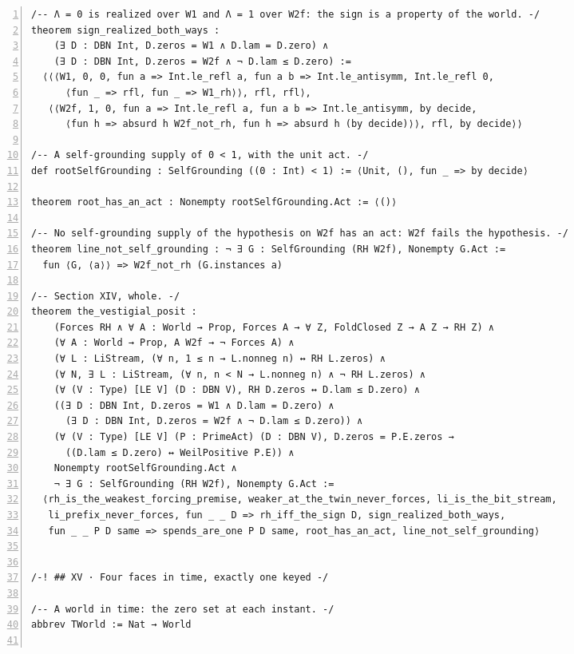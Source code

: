 \documentclass[10pt]{article}
\newcommand{\leansize}{\fontsize{5.5pt}{6.75pt}\selectfont}
\begin{document}
\begin{multicols}{2}
\begin{Verbatim}[numbers=left,firstnumber=1,numbersep=3pt,xleftmargin=2.6em,breaklines=true,breakanywhere=true,breakautoindent=false,breakindent=1.4em,breaksymbolleft={},breakanywheresymbolpre={},fontsize=\leansize]
/-- Λ = 0 is realized over W1 and Λ = 1 over W2f: the sign is a property of the world. -/
theorem sign_realized_both_ways :
    (∃ D : DBN Int, D.zeros = W1 ∧ D.lam = D.zero) ∧
    (∃ D : DBN Int, D.zeros = W2f ∧ ¬ D.lam ≤ D.zero) :=
  ⟨⟨⟨W1, 0, 0, fun a => Int.le_refl a, fun a b => Int.le_antisymm, Int.le_refl 0,
      ⟨fun _ => rfl, fun _ => W1_rh⟩⟩, rfl, rfl⟩,
   ⟨⟨W2f, 1, 0, fun a => Int.le_refl a, fun a b => Int.le_antisymm, by decide,
      ⟨fun h => absurd h W2f_not_rh, fun h => absurd h (by decide)⟩⟩, rfl, by decide⟩⟩

/-- A self-grounding supply of 0 < 1, with the unit act. -/
def rootSelfGrounding : SelfGrounding ((0 : Int) < 1) := ⟨Unit, (), fun _ => by decide⟩

theorem root_has_an_act : Nonempty rootSelfGrounding.Act := ⟨()⟩

/-- No self-grounding supply of the hypothesis on W2f has an act: W2f fails the hypothesis. -/
theorem line_not_self_grounding : ¬ ∃ G : SelfGrounding (RH W2f), Nonempty G.Act :=
  fun ⟨G, ⟨a⟩⟩ => W2f_not_rh (G.instances a)

/-- Section XIV, whole. -/
theorem the_vestigial_posit :
    (Forces RH ∧ ∀ A : World → Prop, Forces A → ∀ Z, FoldClosed Z → A Z → RH Z) ∧
    (∀ A : World → Prop, A W2f → ¬ Forces A) ∧
    (∀ L : LiStream, (∀ n, 1 ≤ n → L.nonneg n) ↔ RH L.zeros) ∧
    (∀ N, ∃ L : LiStream, (∀ n, n < N → L.nonneg n) ∧ ¬ RH L.zeros) ∧
    (∀ (V : Type) [LE V] (D : DBN V), RH D.zeros ↔ D.lam ≤ D.zero) ∧
    ((∃ D : DBN Int, D.zeros = W1 ∧ D.lam = D.zero) ∧
      (∃ D : DBN Int, D.zeros = W2f ∧ ¬ D.lam ≤ D.zero)) ∧
    (∀ (V : Type) [LE V] (P : PrimeAct) (D : DBN V), D.zeros = P.E.zeros →
      ((D.lam ≤ D.zero) ↔ WeilPositive P.E)) ∧
    Nonempty rootSelfGrounding.Act ∧
    ¬ ∃ G : SelfGrounding (RH W2f), Nonempty G.Act :=
  ⟨rh_is_the_weakest_forcing_premise, weaker_at_the_twin_never_forces, li_is_the_bit_stream,
   li_prefix_never_forces, fun _ _ D => rh_iff_the_sign D, sign_realized_both_ways,
   fun _ _ P D same => spends_are_one P D same, root_has_an_act, line_not_self_grounding⟩


/-! ## XV · Four faces in time, exactly one keyed -/

/-- A world in time: the zero set at each instant. -/
abbrev TWorld := Nat → World


\end{Verbatim}
\end{multicols}
\end{document}
